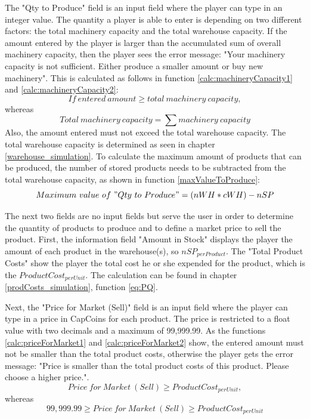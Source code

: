 The "Qty to Produce" field is an input field where the player can type in an integer value. The quantity a player is able to enter is depending on two different factors: the total machinery capacity and the total warehouse capacity. If the amount entered by the player is larger than the accumulated sum of overall machinery capacity, then the player sees the error message: "Your machinery capacity is not sufficient. Either produce a smaller amount or buy new machinery". This is calculated as follows in function \ref{calc:machineryCapacity1} and \ref{calc:machineryCapacity2}:
\begin{equation}
\label{calc:machineryCapacity1}
   If~entered~amount \geqslant total~machinery~capacity, 
\end{equation}
whereas 
\begin{equation}
\label{calc:machineryCapacity2}
    Total~machinery~capacity = \sum machinery~capacity
\end{equation}
Also, the amount entered must not exceed the total warehouse capacity. The total warehouse capacity is determined as seen in chapter \ref{warehouse_simulation}. To calculate the maximum amount of products that can be produced, the number of stored products needs to be subtracted from the total warehouse capacity, as shown in function \ref{maxValueToProduce}:
\begin{equation}
\label{maxValueToProduce}
    Maximum~value~of~"Qty~to~Produce" = (nWH * cWH) - nSP
\end{equation}

The next two fields are no input fields but serve the user in order to determine the quantity of products to produce and to define a market price to sell the product. First, the information field "Amount in Stock" displays the player the amount of each product in the warehouse(s), so $nSP_{per Product}$. The "Total Product Costs" show the player the total cost he or she expended for the product, which is the $ProductCost_{perUnit}$. The calculation can be found in chapter \ref{prodCosts_simulation}, function \ref{eq:PQ}.

Next, the "Price for Market (Sell)" field is an input field where the player can type in a price in CapCoins for each product. The price is restricted to a float value with two decimals and a maximum of 99,999.99. As the functions \ref{calc:priceForMarket1} and \ref{calc:priceForMarket2} show, the entered amount must not be smaller than the total product costs, otherwise the player gets the error message: "Price is smaller than the total product costs of this product. Please choose a higher price.".
\begin{equation}
\label{calc:priceForMarket1}
    Price~for~Market~(Sell) \geqslant ProductCost_{perUnit},
\end{equation}
whereas
\begin{equation}
\label{calc:priceForMarket2}
    99,999.99 \geqslant Price~for~Market~(Sell) \geqslant ProductCost_{perUnit}
\end{equation}

